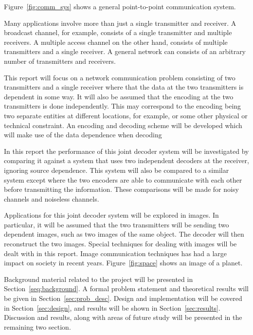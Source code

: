 \documentclass[10pt]{article}
\begin{document}
Figure~\ref{fig:comm_sys} shows a general point-to-point communication system.

Many applications involve more than just a single transmitter and receiver. A broadcast channel, for example, consists of a single transmitter and multiple receivers. A multiple access channel on the other hand, consists of multiple transmitters and a single receiver. A general network can consists of an arbitrary number of transmitters and receivers.

This report will focus on a network communication problem consisting of two transmitters and a single receiver where that the data at the two transmitters is dependent in some way. It will also be assumed that the encoding at the two transmitters is done independently. This may correspond to the encoding being two separate entities at different locations, for example, or some other physical or technical constraint. An encoding and decoding scheme will be developed which will make use of the data dependence when decoding 

In this report the performance of this joint decoder system will be investigated by comparing it against a system that uses two independent decoders at the receiver, ignoring source dependence. This system will also be compared to a similar system except where the two encoders are able to communicate with each other before transmitting the information. These comparisons will be made for noisy channels and noiseless channels. 

Applications for this joint decoder system will be explored in images. In particular, it will be assumed that the two transmitters will be sending two dependent images, such as two images of the same object. The decoder will then reconstruct the two images. Special techniques for dealing with images will be dealt with in this report. Image communication techniques has had a large impact on society in recent years. Figure~\ref{fig:space} shows an image of a planet.

Background material related to the project will be presented in Section~\ref{seq:background}. A formal problem statement and theoretical results will be given in Section~\ref{sec:prob_desc}. Design and implementation will be covered in Section~\ref{sec:design}, and results will be shown in Section~\ref{sec:results}. Discussion and results, along with areas of future study will be presented in the remaining two section.
\end{document}
